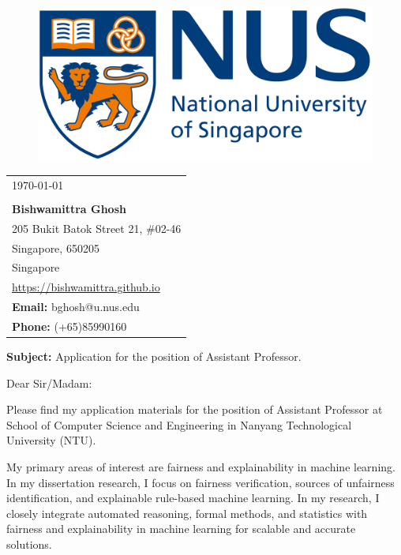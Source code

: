 \documentclass[a4paper,10pt]{article}
\newcommand{\blue}[1]{\textcolor{blue}{#1}}
\begin{document}
	
	
	
	\begin{figure}[t]
		\includegraphics[scale=0.03]{logo}
	\end{figure}
	\noindent\makebox[\linewidth]{\rule{\textwidth}{1pt}}
	
	
	\begin{flushright}
		\begin{tabular}{l@{}}
			\today \\
			\newline \\
			\textbf{Bishwamittra Ghosh}\\
			205 Bukit Batok Street 21, \#02-46\\ 
			Singapore, 650205\\
			Singapore\\
			\blue{\url{https://bishwamittra.github.io}}\\
			\textbf{Email:} bghosh@u.nus.edu\\
			\textbf{Phone:} (+65)85990160\\
		\end{tabular}%
	\end{flushright}


	\textbf{Subject:} Application for the position of Assistant Professor. 
	
	
	
	\vspace{1em}
	Dear Sir/Madam:
	
	
	
	\vspace{1em}
	Please find my application materials for the position of Assistant Professor at School of Computer Science and Engineering in Nanyang Technological University (NTU).
	
	\vspace{1em}
	My primary areas of interest are  fairness and explainability in machine learning. In my dissertation research, I focus on  fairness verification, sources of unfairness identification, and  explainable rule-based machine learning. In my research, I closely integrate automated reasoning, formal methods, and statistics with fairness and explainability in machine learning for scalable and accurate solutions.
	
\end{document}
